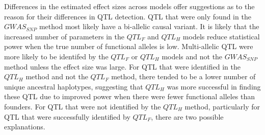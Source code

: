 \documentclass[article,9pt,twocolumn,twoside]{rilabRxiv}
\begin{document}
Differences in the estimated effect sizes across models offer suggestions as to the reason for their differences in QTL detection.
QTL that were only found in the $GWAS_{SNP}$ method most likely have a bi-allelic causal variant.
It is likely that the increased number of parameters in the $QTL_F$ and $QTL_H$ models reduce statistical power when the true number of functional alleles is low.
Multi-allelic QTL were more likely to be identifed by the $QTL_F$ or $QTL_H$ models and not the $GWAS_{SNP}$ method unless the effect size was large.
For QTL that were identified in the $QTL_H$ method and not the $QTL_F$ method, there tended to be a lower number of unique ancestral haplotypes, suggesting that $QTL_H$ was more successful in finding these QTL due to improved power when there were fewer functional alleles than founders.
For QTL that were not identified by  the $QTL_H$ method, particularly for QTL that were successfully identified by $QTL_F$, there are two possible explanations.
\end{document}

